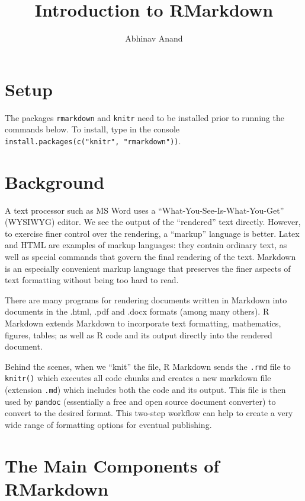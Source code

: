 \documentclass[11pt,]{article}
\title{Introduction to RMarkdown}
\author{Abhinav Anand}
\date{}
\begin{document}
\maketitle

\section{Setup}\label{setup}

The packages \texttt{rmarkdown} and \texttt{knitr} need to be installed
prior to running the commands below. To install, type in the console
\texttt{install.packages(c("knitr",\ "rmarkdown"))}.

\section{Background}\label{background}

A text processor such as MS Word uses a ``What-You-See-Is-What-You-Get''
(WYSIWYG) editor. We see the output of the ``rendered'' text directly.
However, to exercise finer control over the rendering, a ``markup''
language is better. Latex and HTML are examples of markup languages:
they contain ordinary text, as well as special commands that govern the
final rendering of the text. Markdown is an especially convenient markup
language that preserves the finer aspects of text formatting without
being too hard to read.

There are many programs for rendering documents written in Markdown into
documents in the .html, .pdf and .docx formats (among many others). R
Markdown extends Markdown to incorporate text formatting, mathematics,
figures, tables; as well as R code and its output directly into the
rendered document.

Behind the scenes, when we ``knit'' the file, R Markdown sends the
\texttt{.rmd} file to \texttt{knitr()} which executes all code chunks
and creates a new markdown file (extension \texttt{.md}) which includes
both the code and its output. This file is then used by \texttt{pandoc}
(essentially a free and open source document converter) to convert to
the desired format. This two-step workflow can help to create a very
wide range of formatting options for eventual publishing.

\section{The Main Components of
RMarkdown}\label{the-main-components-of-rmarkdown}
\end{document}

